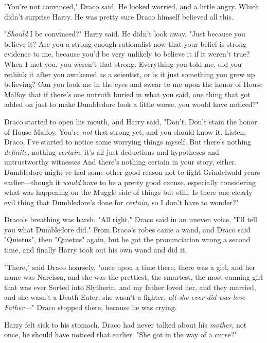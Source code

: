 "You're not convinced," Draco said. He looked worried, and a little angry.
Which didn't surprise Harry. He was pretty sure Draco himself believed all this.

"\emph{Should} I be convinced?" Harry said. He didn't look away. "Just because
you believe it? Are you a strong enough rationalist now that your belief is
strong evidence to me, because you'd be very unlikely to believe it if it
weren't true? When I met you, you weren't that strong. Everything you told me,
did you rethink it after you awakened as a scientist, or is it just something
you grew up believing? Can you look me in the eyes and swear to me upon the
honor of House Malfoy that if there's one untruth buried in what you said, one
thing that got added on just to make Dumbledore look a little worse, you would
have noticed?"

Draco started to open his mouth, and Harry said, "Don't. Don't stain the honor
of House Malfoy. You're \emph{not} that strong yet, and you should know it.
Listen, Draco, I've started to notice some worrying things myself. But there's
nothing \emph{definite,} nothing \emph{certain,} it's all just deductions and
hypotheses and untrustworthy witnesses{\el} And there's nothing certain in
your story, either. Dumbledore might've had some other good reason not to fight
Grindelwald years earlier---though it \emph{would} have to be a pretty good
excuse, especially considering what was happening on the Muggle side of
things{\el} but still. Is there one clearly evil thing that Dumbledore's
done for \emph{certain,} so I don't have to wonder?"

Draco's breathing was harsh. "All right," Draco said in an uneven voice, "I'll
tell you what Dumbledore did." From Draco's robes came a wand, and Draco said
"Quietus", then "Quietus" again, but he got the pronunciation wrong a second
time, and finally Harry took out his own wand and did it.

"There," said Draco hoarsely, "once upon a time there, there was a girl, and
her name was Narcissa, and she was the prettiest, the smartest, the most
cunning girl that was ever Sorted into Slytherin, and my father loved her, and
they married, and she wasn't a Death Eater, she wasn't a fighter, \emph{all she
ever did was love Father}\mbox{---}" Draco stopped there, because he was crying.

Harry felt sick to his stomach. Draco had never talked about his \emph{mother},
not once, he should have noticed that earlier. "She{\el} got in the way of a
curse?"

